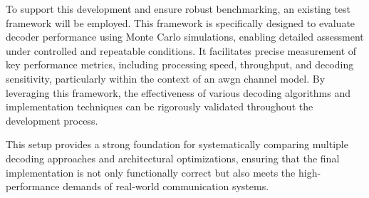 \documentclass[../main.tex]{subfiles}
\begin{document}
To support this development and ensure robust benchmarking, an existing test framework will be employed. 
This framework is specifically designed to evaluate decoder performance using Monte Carlo simulations, enabling detailed assessment under controlled and repeatable conditions. 
It facilitates precise measurement of key performance metrics, including processing speed, throughput, and decoding sensitivity, particularly within the context of an \gls{awgn} channel model. 
By leveraging this framework, the effectiveness of various decoding algorithms and implementation techniques can be rigorously validated throughout the development process.

This setup provides a strong foundation for systematically comparing multiple decoding approaches and architectural optimizations, ensuring that the final implementation is not only functionally correct but also meets the high-performance demands of real-world communication systems.
\end{document}
